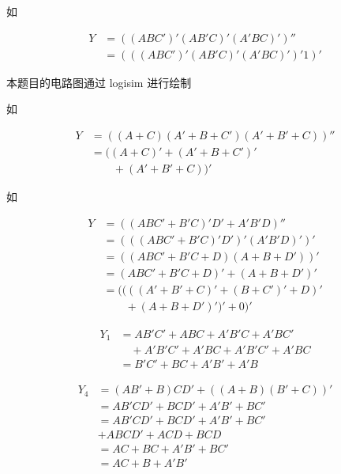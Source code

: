 \documentclass[lang=cn,11pt,a4paper,cite=authoryear,twocolumn]{elegantpaper}
\begin{document}

如

\[\begin{aligned}
    Y &= ((ABC')' (AB'C)' (A'BC)')''\\
    &= (((ABC')' (AB'C)' (A'BC)')' 1)'
\end{aligned}\]



本题目的电路图通过 logisim 进行绘制


如

\[\begin{aligned}
    Y &= ((A+C)(A'+B+C')(A'+B'+C))'' \\
    &= ((A+C)' + (A'+B+C')' \\
    & \quad\quad + (A'+B'+C))' 
\end{aligned}\]


如

\[\begin{aligned}
    Y &= ((ABC' + B'C)'D' + A'B'D)'' \\
    &= (((ABC' + B'C)'D')' (A'B'D)' )'\\
    &= ((ABC'+B'C + D) (A+B+D'))' \\
    &= (ABC'+B'C + D)' + (A+B+D')' \\
    &= ((((A'+B'+C)' + (B+C')' + D)' \\
    & \quad\quad + (A+B+D')' )' + 0)' 
\end{aligned}\]



\[
\begin{aligned}
Y_1 &= AB'C'+ ABC + A'B'C + A'BC' \\
& \quad + A'B'C' + A'BC + A'B'C' + A'BC \\
&= B'C'+BC+A'B'+A'B
\end{aligned}    
\]


\[
\begin{aligned}
Y_4 &= (AB'+B)CD' + ((A+B)(B'+C))' \\
&= AB'CD' + BCD' + A'B' + BC' \\
&= AB'CD' + BCD' + A'B' + BC' \\
& + ABCD' + ACD + BCD \\
&= AC + BC + A'B' + BC' \\
&= AC + B + A'B'
\end{aligned}    
\]



\end{document}
